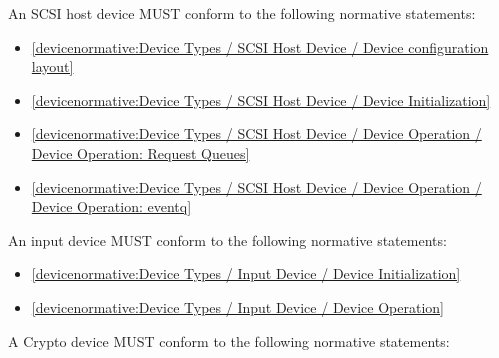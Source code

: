 \label{sec:Conformance / Device Conformance / SCSI Host Device Conformance}

An SCSI host device MUST conform to the following normative statements:

\begin{itemize}
\item \ref{devicenormative:Device Types / SCSI Host Device / Device configuration layout}
\item \ref{devicenormative:Device Types / SCSI Host Device / Device Initialization}
\item \ref{devicenormative:Device Types / SCSI Host Device / Device Operation / Device Operation: Request Queues}
\item \ref{devicenormative:Device Types / SCSI Host Device / Device Operation / Device Operation: eventq}
\end{itemize}

\label{sec:Conformance / Device Conformance / Input Device Conformance}

An input device MUST conform to the following normative statements:

\begin{itemize}
\item \ref{devicenormative:Device Types / Input Device / Device Initialization}
\item \ref{devicenormative:Device Types / Input Device / Device Operation}
\end{itemize}

\label{sec:Conformance / Device Conformance / Crypto Device Conformance}

A Crypto device MUST conform to the following normative statements:

